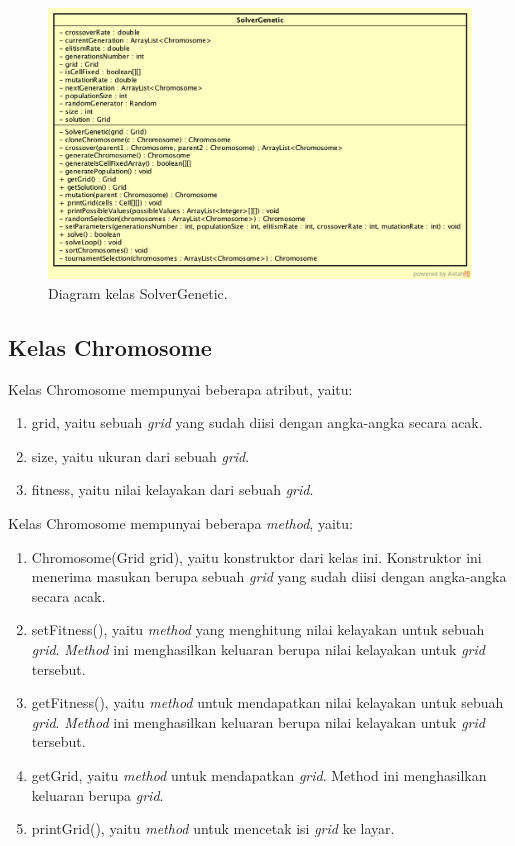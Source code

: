 \begin{figure}
\centering
\captionsetup{justification=centering}
\includegraphics[scale=0.4]{Gambar/Perancangan/DiagramKelasSolverGenetic.png}
\caption[Diagram kelas SolverGenetic.]{Diagram kelas SolverGenetic.}
\label{fig:diagramkelassolvergenetic}
\end{figure}

\subsection{Kelas Chromosome}
\label{sec:kelaschromosome}

Kelas Chromosome mempunyai beberapa atribut, yaitu:

\begin{enumerate}
\item grid, yaitu sebuah \textit{grid} yang sudah diisi dengan angka-angka secara acak.
\item size, yaitu ukuran dari sebuah \textit{grid}.
\item fitness, yaitu nilai kelayakan dari sebuah \textit{grid}.
\end{enumerate}

Kelas Chromosome mempunyai beberapa \textit{method}, yaitu:

\begin{enumerate}
\item Chromosome(Grid grid), yaitu konstruktor dari kelas ini. Konstruktor ini menerima masukan berupa sebuah \textit{grid} yang sudah diisi dengan angka-angka secara acak.
\item setFitness(), yaitu \textit{method} yang menghitung nilai kelayakan untuk sebuah \textit{grid}. \textit{Method} ini menghasilkan keluaran berupa nilai kelayakan untuk \textit{grid} tersebut.
\item getFitness(), yaitu \textit{method} untuk mendapatkan nilai kelayakan untuk sebuah \textit{grid}. \textit{Method} ini menghasilkan keluaran berupa nilai kelayakan untuk \textit{grid} tersebut.
\item getGrid, yaitu \textit{method} untuk mendapatkan \textit{grid}. Method ini menghasilkan keluaran berupa \textit{grid}.
\item printGrid(), yaitu \textit{method} untuk mencetak isi \textit{grid} ke layar.
\end{enumerate}

